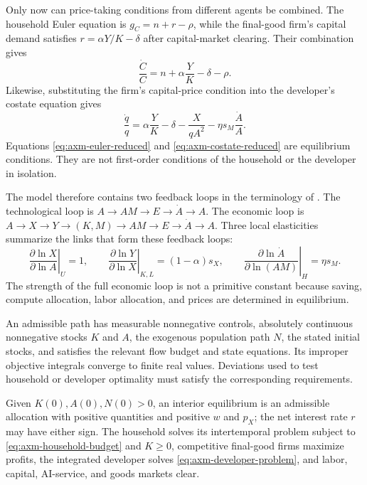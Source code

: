 Only now can price-taking conditions from different agents be combined. The
household Euler equation is \(g_C=n+r-\rho\), while the final-good firm's capital
demand satisfies \(r=\alpha Y/K-\delta\) after capital-market clearing. Their
combination gives
\begin{equation}
 \frac{\dot C}{C}=n+\alpha\frac{Y}{K}-\delta-\rho.
 \label{eq:axm-euler-reduced}
\end{equation}
Likewise, substituting the firm's capital-price condition into the developer's
costate equation gives
\begin{equation}
 \frac{\dot q}{q}=\alpha\frac{Y}{K}-\delta-\frac{X}{qA^2}
 -\eta s_M\frac{\dot A}{A}.
 \label{eq:axm-costate-reduced}
\end{equation}
Equations \eqref{eq:axm-euler-reduced} and
\eqref{eq:axm-costate-reduced} are equilibrium conditions. They are not
first-order conditions of the household or the developer in isolation.

The model therefore contains two feedback loops in the terminology of
\citet{davidsonetal2026}. The technological loop is
\(A\to AM\to E\to\dot A\to A\). The economic loop is
\(A\to X\to Y\to(K,M)\to AM\to E\to\dot A\to A\).
Three local elasticities summarize the links that form these feedback loops:
\begin{equation}
 \left.\frac{\partial\ln X}{\partial\ln A}\right|_U=1,\qquad
 \left.\frac{\partial\ln Y}{\partial\ln X}\right|_{K,L}
 =(1-\alpha)s_X,\qquad
 \left.\frac{\partial\ln\dot A}{\partial\ln(AM)}\right|_H=\eta s_M.
 \label{eq:axm-local-feedback-links}
\end{equation}
The strength of the full economic loop is not a primitive constant because
saving, compute allocation, labor allocation, and prices are determined in
equilibrium.

\begin{definition}
An admissible path has measurable nonnegative controls, absolutely continuous
nonnegative stocks \(K\) and \(A\), the exogenous population path \(N\), the
stated initial stocks, and satisfies the
relevant flow budget and state equations. Its improper objective integrals
converge to finite real values. Deviations used to test household or developer
optimality must satisfy the corresponding requirements.
\end{definition}

\begin{definition}
Given \(K(0),A(0),N(0)>0\), an interior equilibrium is an admissible allocation
with positive quantities and positive \(w\) and \(p_X\); the net interest rate
\(r\) may have either sign. The household solves its intertemporal problem
subject to \eqref{eq:axm-household-budget} and \(K\geq0\), competitive
final-good firms maximize profits, the integrated developer solves
\eqref{eq:axm-developer-problem}, and labor, capital, AI-service, and goods
markets clear.
\end{definition}

